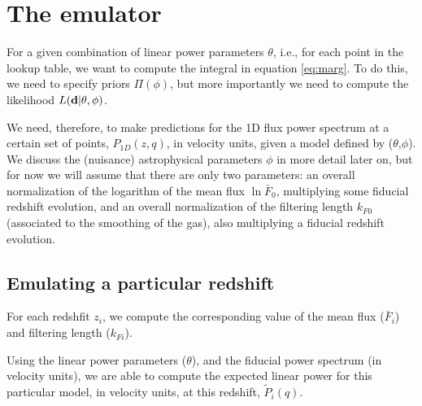 \section{The emulator} \label{sec:emu}

For a given combination of linear power parameters $\theta$, i.e., for
each point in the lookup table, we want to compute the integral in
equation \ref{eq:marg}.
To do this, we need to specify priors $\Pi(\phi)$, but more importantly
we need to compute the likelihood $L(\mathbf{d} | \theta, \phi)$.

We need, therefore, to make predictions for the 1D flux power spectrum
at a certain set of points, $P_{1D}(z,q)$, in velocity units, given a model
defined by ($\theta$,$\phi$).
We discuss the (nuisance) astrophysical parameters $\phi$ in more detail
later on, but for now we will assume that there are only two parameters:
an overall normalization of the logarithm of the mean flux $\ln{\bar F_0}$,
multiplying some fiducial redshift evolution, and an overall normalization
of the filtering length $k_{F 0}$ (associated to the smoothing of the gas),
also multiplying a fiducial redshift evolution. 


\subsection{Emulating a particular redshift}

For each redshfit $z_i$, we compute the corresponding value of the mean flux
($\bar F_i$) and filtering length ($k_{Fi}$).

Using the linear power parameters ($\theta$), and the fiducial
power spectrum (in velocity units), we are able to compute the expected
linear power for this particular model, in velocity units, at this redshift,
$\tilde P_i(q)$.



